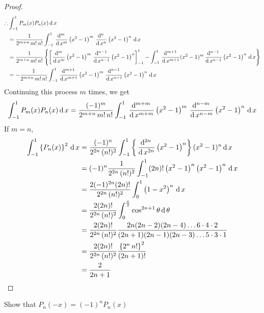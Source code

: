 \documentclass[../main-sheet.tex]{subfiles}
\begin{document}
\begin{proof}
\[    \]
    \begin{align*}
        \therefore&\int_{-1}^1 P_m(x)P_n(x)\,\mathrm{d}\, x\\
        &=\frac{1}{2^{m+n}\,m!\,n!}\int_{-1}^1\,\frac{\mathrm{d}^{m}\, }{\mathrm{d}\, x^{m}}\left(x^2-1\right)^m\,\frac{\mathrm{d}^{n}\, }{\mathrm{d}\, x^{n}}\left(x^2-1\right)^n\,\mathrm{d}\, x\\
        &=\frac{1}{2^{m+n}\,m!\,n!}\left\{\left[\,\frac{\mathrm{d}^{m}\, }{\mathrm{d}\, x^{m}}\left(x^2-1\right)^m\,\frac{\mathrm{d}^{n-1}\, }{\mathrm{d}\, x^{n-1}}\left(x^2-1\right)^n\right]_{-1}^1-\int_{-1}^1\,\frac{\mathrm{d}^{m+1}\, }{\mathrm{d}\, x^{m+1}}(x^2-1)^m\,\frac{\mathrm{d}^{n-1}\, }{\mathrm{d}\, x^{n-1}}\left(x^2-1\right)^n\,\mathrm{d}\, x\right\}\\
        &=-\frac{1}{2^{m+n}\,m!\,n!}\int_{-1}^1 \,\frac{\mathrm{d}^{m+1}\, }{\mathrm{d}\, x^{m+1}}\left(x^2-1\right)^m\,\frac{\mathrm{d}^{n-1}\, }{\mathrm{d}\, x^{n-1}}\left(x^2-1\right)^n\,\mathrm{d}\, x
    \end{align*}
    Continuing this process $ m $ times, we get
    \[
        \int_{-1}^1 P_m(x)P_n(x)\,\mathrm{d}\, x=\frac{(-1)^m}{2^{m+n}\,m!\,n!}\int_{-1}^1 \,\frac{\mathrm{d}^{m+m}\, }{\mathrm{d}\, x^{m+m}}\left(x^2-1\right)^m\,\frac{\mathrm{d}^{n-m}\, }{\mathrm{d}\, x^{n-m}}\left(x^2-1\right)^n\,\mathrm{d}\, x
    \]
    If $ m=n $,
    \begin{align*}
        \int_{-1}^1 \left\{P_n(x)\right\}^2\,\mathrm{d}\, x&=\frac{(-1)^n}{2^{2n}\,(n!)^2}\int_{-1}^1\left\{ \,\frac{\mathrm{d}^{2n}\, }{\mathrm{d}\, x^{2n}}\left(x^2-1\right)^n\right\}(x^2-1)^n\,\mathrm{d}\, x \\
        &=(-1)^n\frac{1}{2^{2n}\,(n!)^2}\int_{-1}^1(2n)!\left(x^2-1\right)^n\left(x^2-1\right)^n\,\mathrm{d}\, x\\
        &=\frac{2(-1)^{2n}(2n)!}{2^{2n}\,(n!)^2}\int_{0}^1\left(1-x^2\right)^n\,\mathrm{d}\, x\\
        &=\frac{2(2n)!}{2^{2n}\,(n!)^2}\int_0^{\frac{\pi}{2}}\cos^{2n+1}\theta\,\mathrm{d}\,\theta\\
        &=\frac{2(2n)!}{2^{2n}\,(n!)^2} \frac{2n(2n-2)(2n-4)\dots6\cdot4\cdot2}{(2n+1)(2n-1)(2n-3)\dots 5\cdot3\cdot1}\\
        &=\frac{2(2n)!}{2^{2n}\,(n!)^2}\frac{\left\{ 2^n\,n!\right\}^2}{(2n+1)!}\\
        &=\frac{2}{2n+1}
    \end{align*}
\end{proof}
\begin{prob}
    Show that $ P_n(-x)=(-1)^nP_n(x) $
\end{prob}
\end{document}
